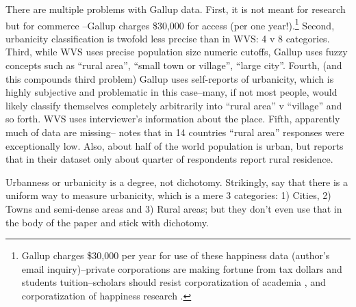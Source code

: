 \documentclass[10pt, letterpaper]{article}
\begin{document}
There are multiple problems with Gallup data. First, it is not meant for
research but for commerce%
--Gallup charges \$30,000 for access (per one
year!).\footnote{Gallup charges \$30,000 per year for use of these happiness data (author's
email inquiry)--private corporations are making fortune from tax dollars and
students tuition--scholars should resist corporatization of academia \citep{mills2012corporatization,cox2013corporatization,millsNYT12fa,CatropaNYT20feb8,schmidlinNYT15oct10}, and
corporatization of happiness research \citep{davies15}.} Second, urbanicity classification is twofold less precise than in WVS: 4
v 8 categories. Third, while WVS uses precise population size numeric cutoffs,
Gallup uses fuzzy concepts such as ``rural area'', ``small town or village'', ``large city''.
Fourth, (and this compounds third problem)  Gallup uses self-reports of urbanicity, which is highly
subjective and problematic in this case--many, if not most people, would likely
classify themselves completely arbitrarily into ``rural area'' v ``village'' and
so forth. WVS uses interviewer's information about the place.
Fifth, apparently much of data are missing--\citet{easterlin10al} notes that in 14 countries
``rural area'' responses were exceptionally low.
Also, about half of the world population is urban, but \citet{burger20} reports that in their
dataset only about quarter of respondents report rural residence.

Urbanness or urbanicity is a degree, not dichotomy. Strikingly, \citet{burger20} say that
there is a uniform way to measure urbanicity, which is a mere 3 categories: 1)
Cities, 2) Towns and semi-dense areas and 3) Rural areas; but they don't even use
that in the body of the paper and stick with dichotomy. 




%
%
\end{document}
